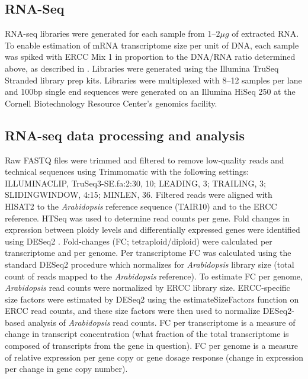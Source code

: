 \documentclass[11pt]{article}
\begin{document}
\subsection*{RNA-Seq}
RNA-seq libraries were generated for each sample from 1--$2\mu g$ of extracted RNA.
To enable estimation of mRNA transcriptome size per unit of DNA, each sample was spiked with ERCC Mix 1 in proportion to the DNA/RNA ratio determined above, as described in \cite{robinson2018}.
Libraries were generated using the Illumina TruSeq Stranded library prep kits.
Libraries were multiplexed with 8--12 samples per lane and 100bp single end sequences were generated on an Illumina HiSeq 250 at the Cornell Biotechnology Resource Center's genomics facility.\\

\subsection*{RNA-seq data processing and analysis}
Raw FASTQ files were trimmed and filtered to remove low-quality reads and technical sequences using Trimmomatic \citep{bolger2014} with the following settings: ILLUMINACLIP, TruSeq3-SE.fa:2:30, 10; LEADING, 3; TRAILING, 3; SLIDINGWINDOW, 4:15; MINLEN, 36.
Filtered reads were aligned with HISAT2 \citep{pertea2016} to the \textit{Arabidopsis} reference sequence (TAIR10) and to the ERCC reference.
HTSeq \citep{anders2015} was used to determine read counts per gene.
Fold changes in expression between ploidy levels and differentially expressed genes were identified using DESeq2 \citep{love2014}.
Fold-changes (FC; tetraploid/diploid) were calculated per transcriptome and per genome.
Per transcriptome FC was calculated using the standard DESeq2 procedure which normalizes for \textit{Arabidopsis} library size (total count of reads mapped to the \textit{Arabidopsis} reference).
To estimate FC per genome, \textit{Arabidopsis} read counts were normalized by ERCC library size.
ERCC-specific size factors were estimated by DESeq2 using the estimateSizeFactors function on ERCC read counts, and these size factors were then used to normalize DESeq2-based analysis of \textit{Arabidopsis} read counts.
FC per transcriptome is a measure of change in transcript concentration (what fraction of the total transcriptome is composed of transcripts from the gene in question).
FC per genome is a measure of relative expression per gene copy or gene dosage response (change in expression per change in gene copy number).\\
\end{document}
